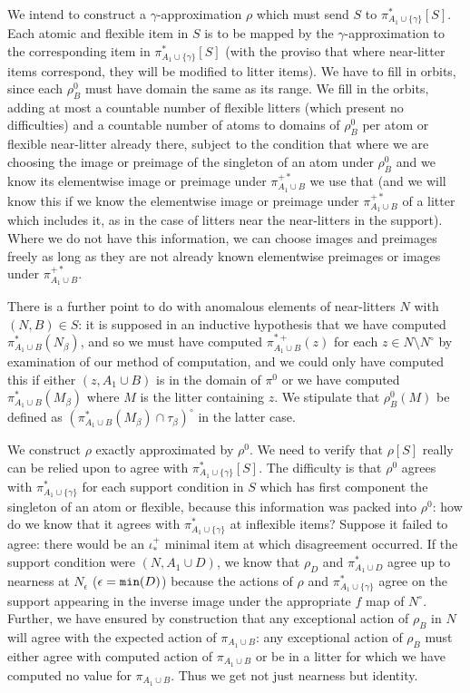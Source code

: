 \documentclass[112pt]{article}
\begin{document}
\begin{description}
We intend to construct a $\gamma$-approximation $\rho$  which must send $S$ to  $\pi_{A_1 \cup \{\gamma\}}^*[S]$.  Each atomic and flexible item in $S$ is to be mapped by the $\gamma$-approximation to the corresponding
item in $\pi_{A_1 \cup \{\gamma\}}^*[S]$ (with the proviso that where near-litter items correspond, they will be modified to litter items).  We have to fill in orbits, since each $\rho^0_B$ must have domain the same as its range.  We fill in the orbits, adding at most a countable number of flexible litters (which present no difficulties) and a countable number of atoms to domains of $\rho^0_B$ per atom or flexible near-litter already there, subject to the condition that where we are choosing the image or preimage of the singleton of an atom under $\rho^0_B$ and we know  its elementwise image or preimage under $\pi_{A_1 \cup B}^{+*}$ we use that (and we will know this if
we know the elementwise image or preimage under $\pi_{A_1 \cup B}^{+*}$ of a litter which includes it, as in the case of litters near the near-litters in the support).  Where we do not have this information, we can choose
images and preimages freely as long as they are not already known elementwise preimages or images under $\pi_{A_1 \cup B}^{+*}$.  

There is a further point to do with anomalous elements of near-litters $N$ with $(N,B) \in S$:  it is supposed in an inductive hypothesis that we have computed $\pi_{A_1 \cup B}^*(N_\beta)$, and so we must have computed $\pi_{A_1 \cup B}^{*+}(z)$ for each $z \in N \setminus N^\circ$ by examination of our method
of computation, and we could only have computed this if either $(z,A_1\cup B)$ is in the domain of $\pi^0$ or we have computed $\pi_{A_1 \cup B}^*(M_\beta)$ where $M$ is the litter containing $z$.  We stipulate that $\rho^0_B(M)$ be defined as  $(\pi_{A_1 \cup B}^*(M_\beta)\cap \tau_\beta)^\circ$ in the latter case.

We construct $\rho$ exactly approximated by $\rho^0$.  We need to verify that $\rho[S]$ really can be relied upon to agree with $\pi^*_{A_1 \cup \{\gamma\}}[S]$.  The difficulty
is that $\rho^0$ agrees with $\pi^*_{A_1 \cup \{\gamma\}}$ for each support condition in $S$ which has first component the singleton of an atom or flexible, because this information was packed into $\rho^0$:  how do we know that it agrees with $\pi^*_{A_1 \cup \{\gamma\}}$  at inflexible items?  Suppose it failed to agree:  there would be an $\iota^+_*$ minimal item at which
disagreement occurred.  If the support condition were $(N,A_1 \cup D)$, we know that $\rho_D$ and $\pi^*_{A_1 \cup D}$ agree up to nearness at $N_\epsilon$ ($\epsilon = {\tt min}(D)$)
because the actions of $\rho$ and  $\pi^*_{A_1 \cup \{\gamma\}}$ agree on the support appearing in the inverse image under the appropriate $f$ map
of $N^\circ$.   Further, we have ensured by construction that any exceptional action of $\rho_B$ in $N$ will agree with the expected action of $\pi_{A_1 \cup B}$:  any exceptional action of $\rho_B$ must either agree with computed action of $\pi_{A_1 \cup B}$ or be in a litter for which we have computed no value for $\pi_{A_1 \cup B}$.  Thus we
get not just nearness but identity.




\end{description}
\end{document}
